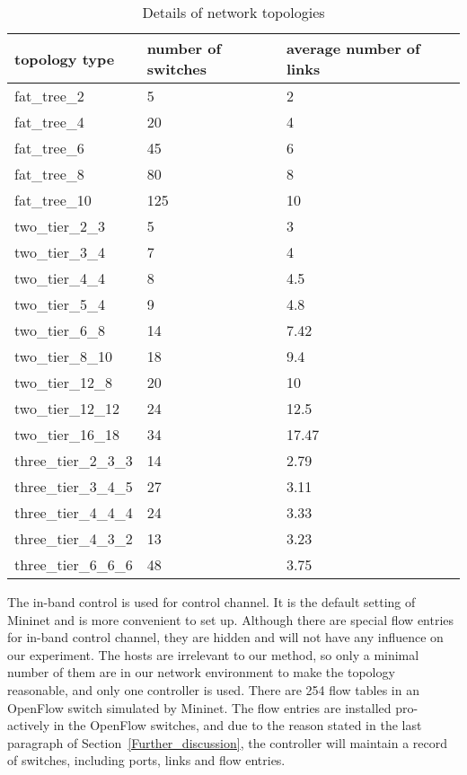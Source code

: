 \begin{table}[H]
\centering
\caption{Details of network topologies}
\begin{tabular}{|l||l|l|l|}
\hline  topology type & number of switches & average number of links\\
\hline
\hline fat\_tree\_2 & 5 & 2 \\
\hline fat\_tree\_4 & 20 & 4 \\
\hline fat\_tree\_6 & 45 & 6 \\
\hline fat\_tree\_8 & 80 & 8 \\
\hline fat\_tree\_10 & 125 & 10 \\
\hline two\_tier\_2\_3 & 5 & 3 \\
\hline two\_tier\_3\_4 & 7 & 4 \\
\hline two\_tier\_4\_4 & 8 & 4.5 \\
\hline two\_tier\_5\_4 & 9 & 4.8 \\
\hline two\_tier\_6\_8 & 14 & 7.42 \\
\hline two\_tier\_8\_10 & 18 & 9.4 \\
\hline two\_tier\_12\_8 & 20 & 10 \\
\hline two\_tier\_12\_12 & 24 & 12.5 \\
\hline two\_tier\_16\_18 & 34 & 17.47 \\
\hline three\_tier\_2\_3\_3 & 14 & 2.79 \\
\hline three\_tier\_3\_4\_5 & 27 & 3.11 \\
\hline three\_tier\_4\_4\_4 & 24 & 3.33 \\
\hline three\_tier\_4\_3\_2 & 13 & 3.23 \\
\hline three\_tier\_6\_6\_6 & 48 & 3.75 \\
\hline 
\end{tabular}
\label{table:network_env}
\end{table}

The in-band control is used for control channel. It is the default setting of Mininet and is more convenient to set up. Although there are special flow entries for in-band control channel, they are hidden and will not have any influence on our experiment. The hosts are irrelevant to our method, so only a minimal number of them  are in our network environment to make the topology reasonable, and only one controller is used. There are 254 flow tables in an OpenFlow switch simulated by Mininet. The flow entries are installed pro-actively in the OpenFlow switches, and due to the reason stated in the last paragraph of Section~\ref{Further_discussion}, the controller will maintain a record of switches, including ports, links and flow entries. 

